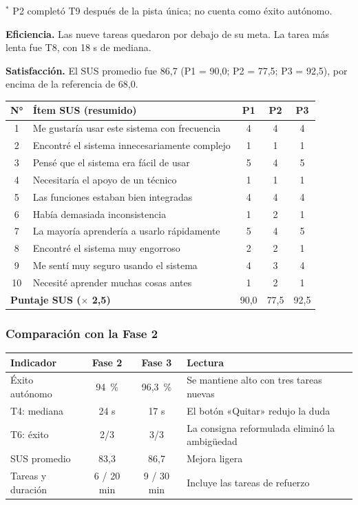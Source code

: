 \documentclass{article}
\begin{document}
{\scriptsize $^{*}$ P2 completó T9 después de la pista única; no cuenta como éxito autónomo.}

\textbf{Eficiencia.} Las nueve tareas quedaron por debajo de su meta. La tarea más lenta fue T8, con 18 s de mediana.

\textbf{Satisfacción.} El SUS promedio fue 86,7 (P1 = 90,0; P2 = 77,5; P3 = 92,5), por encima de la referencia de 68,0.

\begin{center}
\small
\begin{tabular}{|c|p{7.6cm}|c|c|c|}
\hline
\textbf{N°} & \textbf{Ítem SUS (resumido)} & \textbf{P1} & \textbf{P2} & \textbf{P3} \\
\hline
1 & Me gustaría usar este sistema con frecuencia & 4 & 4 & 4 \\
\hline
2 & Encontré el sistema innecesariamente complejo & 1 & 1 & 1 \\
\hline
3 & Pensé que el sistema era fácil de usar & 5 & 4 & 5 \\
\hline
4 & Necesitaría el apoyo de un técnico & 1 & 1 & 1 \\
\hline
5 & Las funciones estaban bien integradas & 4 & 4 & 4 \\
\hline
6 & Había demasiada inconsistencia & 1 & 2 & 1 \\
\hline
7 & La mayoría aprendería a usarlo rápidamente & 5 & 4 & 5 \\
\hline
8 & Encontré el sistema muy engorroso & 2 & 2 & 1 \\
\hline
9 & Me sentí muy seguro usando el sistema & 4 & 3 & 4 \\
\hline
10 & Necesité aprender muchas cosas antes & 1 & 2 & 1 \\
\hline
\multicolumn{2}{|l|}{\textbf{Puntaje SUS ($\times$ 2,5)}} & 90,0 & 77,5 & 92,5 \\
\hline
\end{tabular}
\end{center}

\subsubsection{Comparación con la Fase 2}
\begin{center}
\small
\begin{tabular}{|p{4.6cm}|c|c|p{5.2cm}|}
\hline
\textbf{Indicador} & \textbf{Fase 2} & \textbf{Fase 3} & \textbf{Lectura} \\
\hline
Éxito autónomo & 94~\% & 96,3~\% & Se mantiene alto con tres tareas nuevas \\
\hline
T4: mediana & 24 s & 17 s & El botón «Quitar» redujo la duda \\
\hline
T6: éxito & 2/3 & 3/3 & La consigna reformulada eliminó la ambigüedad \\
\hline
SUS promedio & 83,3 & 86,7 & Mejora ligera \\
\hline
Tareas y duración & 6 / 20 min & 9 / 30 min & Incluye las tareas de refuerzo \\
\hline
\end{tabular}
\end{center}
\end{document}
